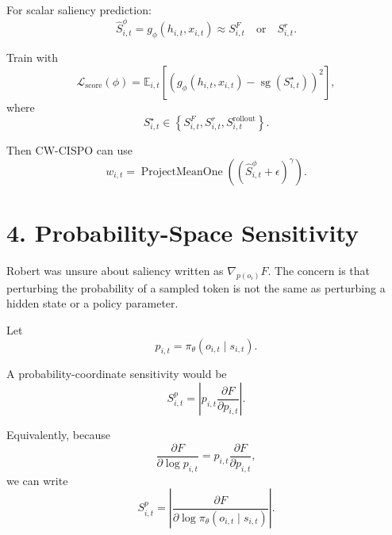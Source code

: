 \documentclass[11pt]{article}
\newcommand{\sg}{\operatorname{sg}}
\newcommand{\ProjectMeanOne}{\operatorname{ProjectMeanOne}}
\newcommand{\E}{\mathbb{E}}
\begin{document}
For scalar saliency prediction:
\begin{equation}
  \hat S^\phi_{i,t}
  =
  g_\phi(h_{i,t}, x_{i,t})
  \approx
  S^F_{i,t}
  \quad \text{or} \quad
  S^r_{i,t}.
\end{equation}

Train with
\begin{equation}
  \mathcal{L}_{\mathrm{score}}(\phi)
  =
  \E_{i,t}
  \left[
    \left(
      g_\phi(h_{i,t}, x_{i,t})
      -
      \sg(S^\star_{i,t})
    \right)^2
  \right],
\end{equation}
where
\begin{equation}
  S^\star_{i,t}
  \in
  \left\{
    S^F_{i,t},
    S^r_{i,t},
    S^{\mathrm{rollout}}_{i,t}
  \right\}.
\end{equation}

Then CW-CISPO can use
\begin{equation}
  w_{i,t}
  =
  \ProjectMeanOne
  \left(
    \left(
      \hat S^\phi_{i,t} + \epsilon
    \right)^\gamma
  \right).
\end{equation}

\section*{4. Probability-Space Sensitivity}

Robert was unsure about saliency written as $\nabla_{p(o_i)} F$. The concern is
that perturbing the probability of a sampled token is not the same as
perturbing a hidden state or a policy parameter.

Let
\begin{equation}
  p_{i,t}
  =
  \pi_\theta(o_{i,t} \mid s_{i,t}).
\end{equation}

A probability-coordinate sensitivity would be
\begin{equation}
  S^p_{i,t}
  =
  \left|
    p_{i,t}
    \frac{\partial F}{\partial p_{i,t}}
  \right|.
\end{equation}

Equivalently, because
\begin{equation}
  \frac{\partial F}{\partial \log p_{i,t}}
  =
  p_{i,t}
  \frac{\partial F}{\partial p_{i,t}},
\end{equation}
we can write
\begin{equation}
  S^p_{i,t}
  =
  \left|
    \frac{\partial F}{\partial \log \pi_\theta(o_{i,t} \mid s_{i,t})}
  \right|.
\end{equation}
\end{document}
